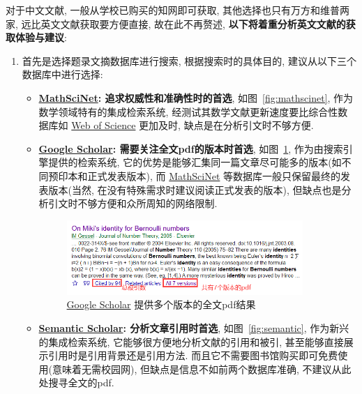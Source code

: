 \documentclass{formatBook}
\begin{document}
对于中文文献, 一般从学校已购买的知网即可获取, 其他选择也只有万方和维普两家, 远比英文文献获取要方便直接, 故在此不再赘述, \textbf{以下将着重分析英文文献的获取体验与建议}:
\begin{enumerate}
    \item 首先是选择题录文摘数据库进行搜索, 根据搜索时的具体目的, 建议从以下三个数据库中进行选择:
          \begin{itemize}
              \item \textbf{\href{https://mathscinet.ams.org/mathscinet}{MathSciNet}: 追求权威性和准确性时的首选}, 如图~\ref{fig:mathscinet}, 作为数学领域特有的集成检索系统, 经测试其数学文献更新速度要比综合性数据库如 \href{http://apps.webofknowledge.com/}{Web of Science} 更加及时, 缺点是在分析引文时不够方便.

              \item \textbf{\href{https://scholar.google.com/}{Google Scholar}: 需要关注全文pdf的版本时首选}, 如图~\ref{fig:googlesch}, 作为由搜索引擎提供的检索系统, 它的优势是能够汇集同一篇文章尽可能多的版本(如不同预印本和正式发表版本), 而 \href{https://mathscinet.ams.org/mathscinet}{MathSciNet} 等数据库一般只保留最终的发表版本(当然, 在没有特殊需求时建议阅读正式发表的版本), 但缺点也是分析引文时不够方便和众所周知的网络限制.
                    \begin{figure}[htbp]
                        \centering
                        \includegraphics[width=0.9\textwidth]{figure/googlescholar.png}
                        \caption{\href{https://scholar.google.com/}{Google Scholar} 提供多个版本的全文pdf结果}
                        \label{fig:googlesch}
                    \end{figure}
              \item \textbf{\href{https://www.semanticscholar.org/}{Semantic Scholar}: 分析文章引用时首选}, 如图~\ref{fig:semantic}, 作为新兴的集成检索系统, 它能够很方便地分析文献的引用和被引, 甚至能够直接展示引用时是引用背景还是引用方法. 而且它不需要图书馆购买即可免费使用(意味着无需校园网), 但缺点是信息不如前两个数据库准确, 不建议从此处搜寻全文的pdf.
                    \begin{figure}[H]

\end{figure}
\end{itemize}
\end{enumerate}
\end{document}
